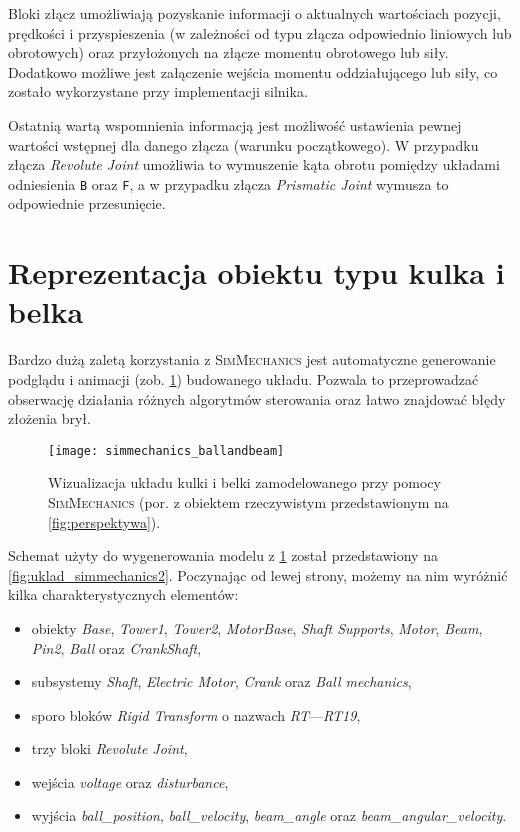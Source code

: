 Bloki złącz umożliwiają pozyskanie informacji o aktualnych wartościach pozycji, prędkości i przyspieszenia (w zależności od typu złącza odpowiednio liniowych lub obrotowych) oraz przyłożonych na złącze momentu obrotowego lub siły. Dodatkowo możliwe jest załączenie wejścia momentu oddziałującego lub siły, co zostało wykorzystane przy implementacji silnika.

Ostatnią wartą wspomnienia informacją jest możliwość ustawienia pewnej wartości wstępnej dla danego złącza (warunku początkowego). W przypadku złącza \textit{Revolute Joint} umożliwia to wymuszenie kąta obrotu pomiędzy układami odniesienia \texttt{B} oraz \texttt{F}, a w przypadku złącza \textit{Prismatic Joint} wymusza to odpowiednie przesunięcie.

\section{Reprezentacja obiektu typu kulka i belka}
\label{sec:ch4_reprezentacja_obiektu_kulka_i_belka}

Bardzo dużą zaletą korzystania z \textsc{SimMechanics} jest automatyczne generowanie podglądu i animacji (zob. \cref{fig:uklad_simmechanics}) budowanego układu. Pozwala to przeprowadzać obserwację działania różnych algorytmów sterowania oraz łatwo znajdować błędy złożenia brył.

\begin{figure}[H]
    \centering
    \texttt{[image: simmechanics\_ballandbeam]}
    \caption{Wizualizacja układu kulki i belki zamodelowanego przy pomocy \textsc{SimMechanics} (por. z obiektem rzeczywistym przedstawionym na \cref{fig:perspektywa}).}
    \label{fig:uklad_simmechanics}
\end{figure}

Schemat użyty do wygenerowania modelu z \cref{fig:uklad_simmechanics} został przedstawiony na \cref{fig:uklad_simmechanics2}. Poczynając od lewej strony, możemy na nim wyróżnić kilka charakterystycznych elementów:

\begin{itemize}
    \item obiekty \textit{Base}, \textit{Tower1}, \textit{Tower2}, \textit{MotorBase}, \textit{Shaft Supports}, \textit{Motor}, \textit{Beam}, \textit{Pin2}, \textit{Ball} oraz \textit{CrankShaft},
    \item subsystemy \textit{Shaft}, \textit{Electric Motor}, \textit{Crank} oraz \textit{Ball mechanics},
    \item sporo bloków \textit{Rigid Transform} o nazwach \textit{RT}---\textit{RT19},
    \item trzy bloki \textit{Revolute Joint},
    \item wejścia \textit{voltage} oraz \textit{disturbance},
    \item wyjścia \textit{ball\_position}, \textit{ball\_velocity}, \textit{beam\_angle} oraz \textit{beam\_angular\_velocity}.
\end{itemize}

